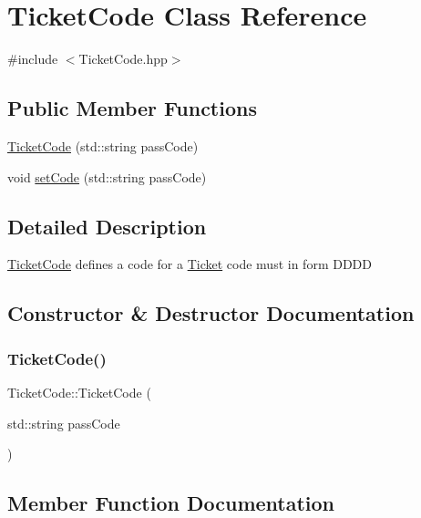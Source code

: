 \hypertarget{class_ticket_code}{}\section{Ticket\+Code Class Reference}
\label{class_ticket_code}


{\ttfamily \#include $<$Ticket\+Code.\+hpp$>$}

\subsection*{Public Member Functions}
\begin{DoxyCompactItemize}
\item 
\mbox{\hyperlink{class_ticket_code_a00ffbbc42bf944095fb7c7f11e75ae1e}{Ticket\+Code}} (std\+::string pass\+Code)
\item 
void \mbox{\hyperlink{class_ticket_code_adc69c4ae676506637a192b213aa4230c}{set\+Code}} (std\+::string pass\+Code)
\end{DoxyCompactItemize}


\subsection{Detailed Description}
\mbox{\hyperlink{class_ticket_code}{Ticket\+Code}} defines a code for a \mbox{\hyperlink{class_ticket}{Ticket}} code must in form D\+D\+DD 

\subsection{Constructor \& Destructor Documentation}
\mbox{\label{class_ticket_code_a00ffbbc42bf944095fb7c7f11e75ae1e}} 
\subsubsection{\texorpdfstring{TicketCode()}{TicketCode()}}
{\footnotesize\ttfamily Ticket\+Code\+::\+Ticket\+Code (\begin{DoxyParamCaption}\item[{std\+::string}]{pass\+Code }\end{DoxyParamCaption})}



\subsection{Member Function Documentation}
\mbox{\label{class_ticket_code_adc69c4ae676506637a192b213aa4230c}} 
